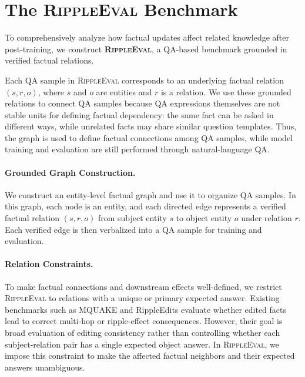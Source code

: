 \section{The \textsc{RippleEval} Benchmark}
\label{sec:dataset}


To comprehensively analyze how factual updates affect related knowledge after post-training, we construct \textbf{\textsc{RippleEval}}, a QA-based benchmark grounded in verified factual relations. 

Each QA sample in \textsc{RippleEval} corresponds to an underlying factual relation $(s,r,o)$, where $s$ and $o$ are entities and $r$ is a relation. We use these grounded relations to connect QA samples because QA expressions themselves are not stable units for defining factual dependency: the same fact can be asked in different ways, while unrelated facts may share similar question templates. Thus, the graph is used to define factual connections among QA samples, while model training and evaluation are still performed through natural-language QA.

\paragraph{Grounded Graph Construction.}
We construct an entity-level factual graph and use it to organize QA samples. In this graph, each node is an entity, and each directed edge represents a verified factual relation $(s,r,o)$ from subject entity $s$ to object entity $o$ under relation $r$. Each verified edge is then verbalized into a QA sample for training and evaluation.


\paragraph{Relation Constraints.}
To make factual connections and downstream effects well-defined, we restrict \textsc{RippleEval} to relations with a unique or primary expected answer. Existing benchmarks such as MQUAKE \cite{zhong2023mquake} and RippleEdits \cite{cohen2023ripple} evaluate whether edited facts lead to correct multi-hop or ripple-effect consequences. However, their goal is broad evaluation of editing consistency rather than controlling whether each subject-relation pair has a single expected object answer. In \textsc{RippleEval}, we impose this constraint to make the affected factual neighbors and their expected answers unambiguous.

